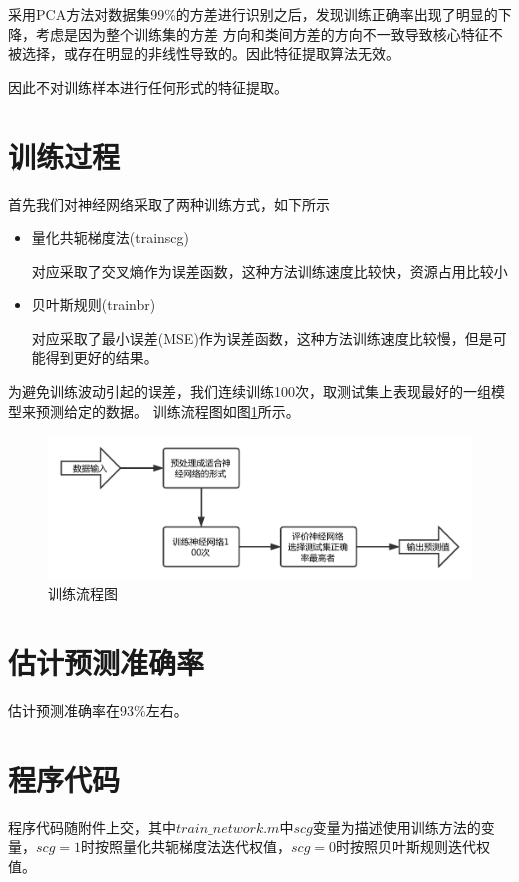 \documentclass[UTF8,a4paper]{paper}
\begin{document}
采用PCA方法对数据集99\%的方差进行识别之后，发现训练正确率出现了明显的下降，考虑是因为整个训练集的方差
方向和类间方差的方向不一致导致核心特征不被选择，或存在明显的非线性导致的。因此特征提取算法无效。

因此不对训练样本进行任何形式的特征提取。

\section{训练过程}
首先我们对神经网络采取了两种训练方式，如下所示
\begin{itemize}
\item 量化共轭梯度法(trainscg)

对应采取了交叉熵作为误差函数，这种方法训练速度比较快，资源占用比较小

\item 贝叶斯规则(trainbr)

对应采取了最小误差(MSE)作为误差函数，这种方法训练速度比较慢，但是可能得到更好的结果。
\end{itemize}

为避免训练波动引起的误差，我们连续训练100次，取测试集上表现最好的一组模型来预测给定的数据。
训练流程图如图\ref{2}所示。

\begin{figure}[b]\centering\includegraphics[width=\textwidth]{flow.pdf}
\caption{训练流程图}\label{2}\end{figure}

\section{估计预测准确率}
估计预测准确率在93\%左右。
\section{程序代码}
程序代码随附件上交，其中$train\_network.m$中$scg$变量为描述使用训练方法的变量，$scg = 1$时按照量化共轭梯度法迭代权值，$scg = 0$时按照贝叶斯规则迭代权值。
\end{document}
